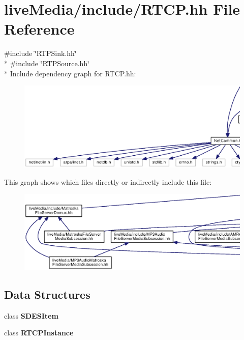 \section{live\+Media/include/\+R\+T\+C\+P.hh File Reference}
\label{RTCP_8hh}
{\ttfamily \#include \char`\"{}R\+T\+P\+Sink.\+hh\char`\"{}}\\*
{\ttfamily \#include \char`\"{}R\+T\+P\+Source.\+hh\char`\"{}}\\*
Include dependency graph for R\+T\+C\+P.\+hh\+:
\nopagebreak
\begin{figure}[H]
\begin{center}
\leavevmode
\includegraphics[width=350pt]{RTCP_8hh__incl}
\end{center}
\end{figure}
This graph shows which files directly or indirectly include this file\+:
\nopagebreak
\begin{figure}[H]
\begin{center}
\leavevmode
\includegraphics[width=350pt]{RTCP_8hh__dep__incl}
\end{center}
\end{figure}
\subsection*{Data Structures}
\begin{DoxyCompactItemize}
\item 
class {\bf S\+D\+E\+S\+Item}
\item 
class {\bf R\+T\+C\+P\+Instance}
\end{DoxyCompactItemize}
